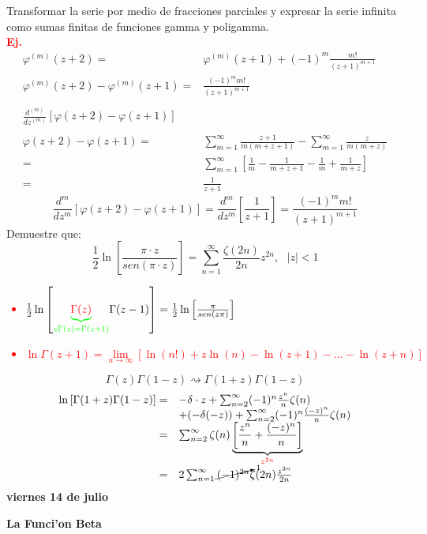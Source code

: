 \documentclass{article}
\theoremstyle{definition}
\begin{document}
Transformar la serie por medio de fracciones parciales y expresar la serie infinita como sumas finitas de funciones gamma y poligamma.\\
\textbf{\textcolor{red}{Ej.}}
\[
\begin{array}{rl}
	\varphi ^{(m)} (z+2)=& \varphi^{(m)} (z+1)+(-1)^{m}\frac{m!}{(z+1)^{m+1}}\\
	\varphi^{(m)} (z+2)-\varphi^{(m)} (z+1)=& \frac{(-1)^mm!}{(z+1)^{m+1}}\\
	\\
	\frac{d^{(m)}}{dz^{(m)}}\left[\varphi (z+2) -\varphi (z+1)\right]\\
	\\
	\varphi (z+2) - \varphi (z+1)=&\sum^{\infty}_{m=1}\frac{z+1}{m(m+z+1)}-\sum^{\infty}_{m=1}\frac{z}{m(m+z)}\\
	=& \sum^{\infty}_{m=1}\left[\frac{1}{m}-\frac{1}{m+z+1}-\frac{1}{m}+\frac{1}{m+z}\right]\\
	=& \frac{1}{z+1}
\end{array}
\]
\[\frac{d^m}{dz^m}\left[\varphi (z+2)-\varphi (z+1)\right] = \frac{d^m}{dz^m}\left[\frac{1}{z+1}\right]=\frac{(-1)^mm!}{(z+1)^{m+1}}\]
Demuestre  que:
\[\frac{1}{2}\ln \left[\frac{\pi\cdot z}{sen(\pi\cdot z)}\right]=\sum^{\infty}_{n=1}\frac{\zeta (2n)}{2n}z^{2n},\ \ \ |z|<1\]
\textcolor{red}{
\begin{itemize}
	\item $\frac{1}{2}\ln\left[\textcolor{green}{\underbrace{\textcolor{red}{\Gamma (z)}}_{z\Gamma (z)=\Gamma (z+1)}}\Gamma (z-1)\right]=\frac{1}{2}\ln\left[\frac{\pi}{sen(z\pi)}\right]$
	\item $\ln \Gamma (z+1) =\lim\limits_{n\to \infty}\left[\ln (n!)+z\ln (n)-\ln (z+1)-...-\ln (z+n)\right]$
\end{itemize}
}
\[\Gamma (z)\Gamma (1-z)\rightsquigarrow\Gamma (1+z)\Gamma (1-z)\]
\[
\begin{array}{rl}
	\ln\left[\Gamma (1+z)\Gamma (1-z)\right]=& -\delta\cdot z +\sum^{\infty}_{n=2}(-1)^n\frac{z^n}{n}\zeta (n)\\
	&+(-\delta(-z))+\sum^{\infty}_{n=2}(-1)^n\frac{(-z)^n}{n}\zeta (n)\\
	=&\sum^{\infty}_{n=2}\zeta (n)\underbrace{\left[\frac{z^n}{n}+\frac{(-z)^n}{n}\right]}_{\textcolor{red}{z^{2n}}}\\
	=& 2\sum^{\infty}_{n=1}\cancelto{1}{(-1)^{2n}}\zeta (2n)\frac{z^{2n}}{2n}
\end{array}
\]
\newpage
\textbf{viernes 14 de julio}

\textbf{La Funci'on Beta}
\end{document}

